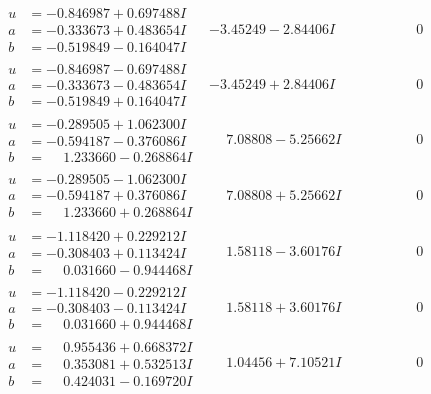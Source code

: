\documentclass[1p]{elsarticle_modified}
\theoremstyle{definition}
\begin{document}
$$\begin{array}{c|c|c}
\begin{aligned}
u &= -0.846987 + 0.697488 I \\
a &= -0.333673 + 0.483654 I \\
b &= -0.519849 - 0.164047 I\end{aligned}
 & -3.45249 - 2.84406 I & \phantom{-0.000000 } 0 \\ \hline\begin{aligned}
u &= -0.846987 - 0.697488 I \\
a &= -0.333673 - 0.483654 I \\
b &= -0.519849 + 0.164047 I\end{aligned}
 & -3.45249 + 2.84406 I & \phantom{-0.000000 } 0 \\ \hline\begin{aligned}
u &= -0.289505 + 1.062300 I \\
a &= -0.594187 - 0.376086 I \\
b &= \phantom{-}1.233660 - 0.268864 I\end{aligned}
 & \phantom{-}7.08808 - 5.25662 I & \phantom{-0.000000 } 0 \\ \hline\begin{aligned}
u &= -0.289505 - 1.062300 I \\
a &= -0.594187 + 0.376086 I \\
b &= \phantom{-}1.233660 + 0.268864 I\end{aligned}
 & \phantom{-}7.08808 + 5.25662 I & \phantom{-0.000000 } 0 \\ \hline\begin{aligned}
u &= -1.118420 + 0.229212 I \\
a &= -0.308403 + 0.113424 I \\
b &= \phantom{-}0.031660 - 0.944468 I\end{aligned}
 & \phantom{-}1.58118 - 3.60176 I & \phantom{-0.000000 } 0 \\ \hline\begin{aligned}
u &= -1.118420 - 0.229212 I \\
a &= -0.308403 - 0.113424 I \\
b &= \phantom{-}0.031660 + 0.944468 I\end{aligned}
 & \phantom{-}1.58118 + 3.60176 I & \phantom{-0.000000 } 0 \\ \hline\begin{aligned}
u &= \phantom{-}0.955436 + 0.668372 I \\
a &= \phantom{-}0.353081 + 0.532513 I \\
b &= \phantom{-}0.424031 - 0.169720 I\end{aligned}
 & \phantom{-}1.04456 + 7.10521 I & \phantom{-0.000000 } 0 \\ \hline\begin{aligned}

\end{aligned}
\end{array}$$
\end{document}
